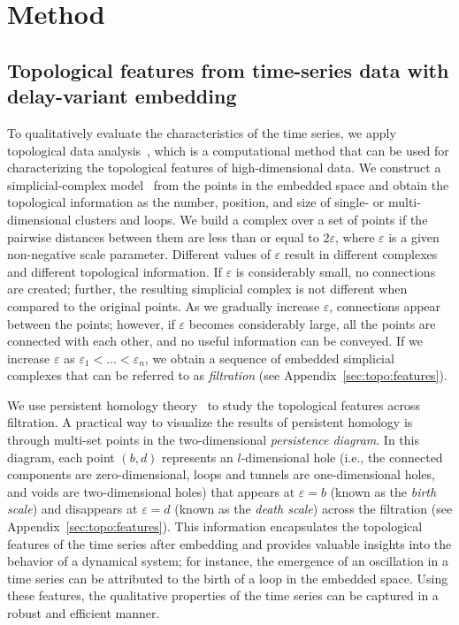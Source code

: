 \documentclass[twocolumn,pre,amsmath,amssymb]{revtex4-1}
\begin{document}
\section{Method}
\subsection{Topological features from time-series data with delay-variant embedding}
To qualitatively evaluate the characteristics of the time series, 
we apply topological data analysis~\cite{carlsson:topology:2009}, 
which is a computational method that can be used 
for characterizing the topological features of high-dimensional data. 
We construct a simplicial-complex model~\cite{edels:topobook:2010} from the points 
in the embedded space and obtain the topological information as the number, position, and size of 
single- or multi-dimensional clusters and loops.
We build a complex over a set of points if the pairwise distances between them are less than or equal to $2\varepsilon$, where $\varepsilon$ is a given non-negative scale parameter. 
Different values of $\varepsilon$ result in different complexes and different topological information.
If $\varepsilon$ is considerably small, no connections are created;
further, the resulting simplicial complex is not different when compared to the original points.
As we gradually increase $\varepsilon$, connections appear between the points;
however, if $\varepsilon$ becomes considerably large, 
all the points are connected with each other,
and no useful information can be conveyed.
If we increase $\varepsilon$ as $\varepsilon_1 < \ldots < \varepsilon_n$, 
we obtain a sequence of embedded simplicial complexes 
that can be referred to as \emph{filtration} (see Appendix~\ref{sec:topo:features}). 

We use persistent homology theory~\cite{edelsbrunner:2002,zomorodian:2005} 
to study the topological features across filtration.
A practical way to visualize the results of persistent homology
is through multi-set points in the two-dimensional \emph{persistence diagram}.
In this diagram, each point $(b,d)$ represents an $l$-dimensional hole 
(i.e., the connected components are zero-dimensional, loops and tunnels are one-dimensional holes, and voids 
are two-dimensional holes) that appears at $\varepsilon=b$ (known as the \emph{birth scale}) and disappears at $\varepsilon=d$ (known as the \emph{death scale}) across the filtration (see Appendix~\ref{sec:topo:features}).
This information encapsulates the topological features of the time series after 
embedding and provides valuable insights into the behavior of a dynamical system;
for instance, the emergence of an oscillation in a time series can be attributed
to the birth of a loop in the embedded space.
Using these features, the qualitative properties of the time series 
can be captured in a robust and efficient manner. 
\end{document}
